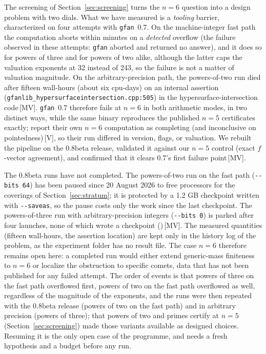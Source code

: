 \documentclass[11pt]{article}
\theoremstyle{definition}
\theoremstyle{remark}
\newcommand{\mk}[1]{\,{\scriptsize[#1]}}
\newcommand{\MV}{\mk{MV}}
\newcommand{\Vm}{\mk{V}}
\begin{document}
The screening of Section~\ref{sec:screening} turns the $n=6$ question into a
design problem with two dials. What we have measured is a \emph{tooling}
barrier, characterized on four attempts with \texttt{gfan}~0.7. On the
machine-integer fast path the computation aborts within minutes on a
\emph{detected} overflow (the failure observed in these attempts: \texttt{gfan} aborted and returned no answer), and it does so for powers of three and for
powers of two alike, although the latter caps the valuation exponents at 32
instead of 243, so the failure is not a matter of valuation magnitude. On the
arbitrary-precision path, the powers-of-two run died after fifteen wall-hours
(about six cpu-days) on an internal assertion
(\texttt{gfanlib\_hypersurfaceintersection.cpp:505}) in the hypersurface-intersection
code\MV. \texttt{gfan}~0.7 therefore fails at $n=6$ in both arithmetic modes, in two
distinct ways, while the same binary reproduces the published $n=5$ certificates
exactly; \cite{JL25} report their own $n=6$ computation as completing (and
inconclusive on pointedness)\Vm, so their run differed in version, flags, or
valuation. We rebuilt the pipeline on the 0.8beta release, validated it against
our $n=5$ control (exact $f$-vector agreement), and confirmed that it clears
0.7's first failure point\MV.

The 0.8beta runs have not completed. The powers-of-two run on the fast path (\texttt{-{}-bits 64}) has been
paused since 20 August 2026 to free processors for the coverings of Section~\ref{sec:stratum}; it is protected by a
1.2 GB checkpoint written with \texttt{-{}-saveas}, so the pause costs only the work since the last checkpoint. The
powers-of-three run with arbitrary-precision integers (\texttt{-{}-bits 0}) is parked after four launches, none of which
wrote a checkpoint ()\MV. The measured quantities
(fifteen wall-hours, the assertion location) are kept only in the history log of the problem, as the experiment folder
has no result file. The case $n=6$ therefore remains open here: a completed run would
either extend generic-mass finiteness to $n=6$ or localize the obstruction to
specific comets, data that has not been published for any failed attempt. The order of events is that powers of three on the fast path overflowed first, powers of two on the fast path overflowed as well, regardless of the magnitude of the exponents, and the
runs were then repeated with the 0.8beta release (powers of two on the fast path) and in arbitrary precision (powers of three); that powers of two and primes certify at $n=5$ (Section~\ref{sec:screening})
made those variants available as designed choices. Resuming it is the only open case of the programme,
and needs a fresh hypothesis and a budget before any run.
\end{document}
